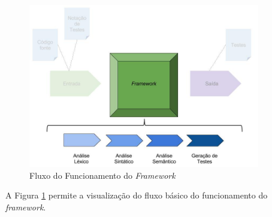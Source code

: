  \begin{figure}[h]
    \centering
    \includegraphics[width=0.9\textwidth]{figuras/Framework-interior.jpg}
    \caption{Fluxo do Funcionamento do \textit{Framework}}
    \label{fig:Framework-interior}
 \end{figure}
 
 \par
 \indent A Figura \ref{fig:Framework-interior} permite a visualização do fluxo básico do funcionamento do \textit{framework}.  

